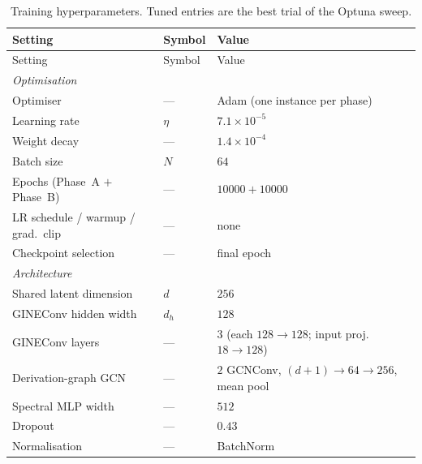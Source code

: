 {\small
\begin{longtable}{@{}l l p{6cm}@{}}
    \caption{Training hyperparameters. Tuned entries are the best trial of the Optuna sweep.}
    \label{tab:training-hyperparams} \\
        \hline
        Setting & Symbol & Value \\
        \hline
        \endfirsthead
        \hline
        Setting & Symbol & Value \\
        \hline
        \endhead
        \multicolumn{3}{l}{\emph{Optimisation}} \\
        Optimiser                         & ---                              & Adam (one instance per phase) \\
        Learning rate                     & $\eta$                           & $7.1\times10^{-5}$ \\
        Weight decay                      & ---                              & $1.4\times10^{-4}$ \\
        Batch size                        & $N$                              & $64$ \\
        Epochs (Phase~A $+$ Phase~B)      & ---                              & $10000 + 10000$ \\
        LR schedule / warmup / grad.\ clip & ---                             & none \\
        Checkpoint selection              & ---                              & final epoch \\
        \hline
        \multicolumn{3}{l}{\emph{Architecture}} \\
        Shared latent dimension           & $d$                              & $256$ \\
        GINEConv hidden width             & $d_h$                            & $128$ \\
        GINEConv layers                   & ---                              & $3$ (each $128\!\to\!128$; input proj.\ $18\!\to\!128$) \\
        Derivation-graph GCN              & ---                              & $2$ GCNConv, $(d{+}1)\!\to\!64\!\to\!256$, mean pool \\
        Spectral MLP width                & ---                              & $512$ \\
        Dropout                           & ---                              & $0.43$ \\
        Normalisation                     & ---                              & BatchNorm \\

\end{longtable}}
